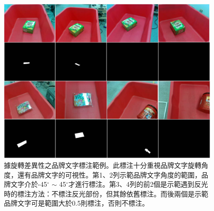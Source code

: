 \begin{figure}[H]
	\centering
	\includegraphics[height=!, width=1.0\linewidth, keepaspectratio=true]
	{./figures/reak_bn_rule.jpg}
  \caption{據旋轉差異性之品牌文字標注範例。此標注十分重視品牌文字旋轉角度，還有品牌文字的可視性。第1、2列示範品牌文字角度的範圍，品牌文字介於-45$^{\circ}$ $\sim$ 45$^{\circ}$才進行標注。第3、4列的前2個是示範遇到反光時的標注方法：不標注反光部份，但其餘依舊標注。而後兩個是示範品牌文字可是範圍大於0.5則標注，否則不標注。}
  \label{figure:reak_bn_rule}
\end{figure}

